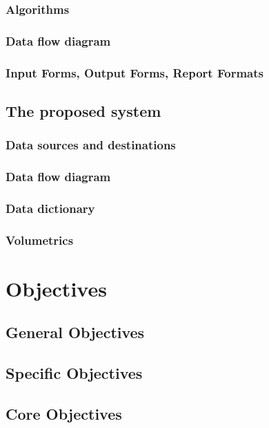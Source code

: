 \subsubsection{Algorithms}


\subsubsection{Data flow diagram}

\subsubsection{Input Forms, Output Forms, Report Formats}

\subsection{The proposed system}

\subsubsection{Data sources and destinations}

\subsubsection{Data flow diagram}

\subsubsection{Data dictionary}

\subsubsection{Volumetrics}

\section{Objectives}

\subsection{General Objectives}

\subsection{Specific Objectives}

\subsection{Core Objectives}

